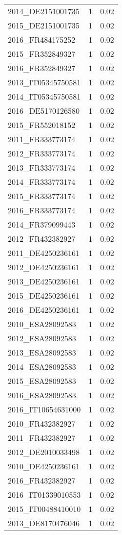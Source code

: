 \begin{table*}[htbp]
\begin{tabular}{lrr}
2014_DE2151001735 & 1 & 0.02 \\
2015_DE2151001735 & 1 & 0.02 \\
2016_FR484175252 & 1 & 0.02 \\
2015_FR352849327 & 1 & 0.02 \\
2016_FR352849327 & 1 & 0.02 \\
2013_IT05345750581 & 1 & 0.02 \\
2014_IT05345750581 & 1 & 0.02 \\
2016_DE5170126580 & 1 & 0.02 \\
2015_FR552018152 & 1 & 0.02 \\
2011_FR333773174 & 1 & 0.02 \\
2012_FR333773174 & 1 & 0.02 \\
2013_FR333773174 & 1 & 0.02 \\
2014_FR333773174 & 1 & 0.02 \\
2015_FR333773174 & 1 & 0.02 \\
2016_FR333773174 & 1 & 0.02 \\
2014_FR379099443 & 1 & 0.02 \\
2012_FR432382927 & 1 & 0.02 \\
2011_DE4250236161 & 1 & 0.02 \\
2012_DE4250236161 & 1 & 0.02 \\
2013_DE4250236161 & 1 & 0.02 \\
2015_DE4250236161 & 1 & 0.02 \\
2016_DE4250236161 & 1 & 0.02 \\
2010_ESA28092583 & 1 & 0.02 \\
2012_ESA28092583 & 1 & 0.02 \\
2013_ESA28092583 & 1 & 0.02 \\
2014_ESA28092583 & 1 & 0.02 \\
2015_ESA28092583 & 1 & 0.02 \\
2016_ESA28092583 & 1 & 0.02 \\
2016_IT10654631000 & 1 & 0.02 \\
2010_FR432382927 & 1 & 0.02 \\
2011_FR432382927 & 1 & 0.02 \\
2012_DE2010033498 & 1 & 0.02 \\
2010_DE4250236161 & 1 & 0.02 \\
2016_FR432382927 & 1 & 0.02 \\
2016_IT01339010553 & 1 & 0.02 \\
2015_IT00488410010 & 1 & 0.02 \\
2013_DE8170476046 & 1 & 0.02 \\

\end{tabular}
\end{table*}
